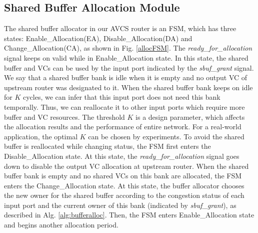 \documentclass[10pt,conference]{IEEEtran}
\begin{document}
\subsection{Shared Buffer Allocation Module}\label{bufmanage}
The shared buffer allocator in our AVCS router is an FSM, which has three states: Enable\_Allocation(EA), Disable\_Allocation(DA) and Change\_Allocation(CA), as shown in Fig. \ref{allocFSM}. The \emph{ready\_for\_allocation} signal keeps on valid while in Enable\_Allocation state. In this state, the shared buffer and VCs can be used by the input port indicated by the \emph{sbuf\_grant} signal. We say that a shared buffer bank is idle when it is empty and no output VC of upstream router was designated to it. When the shared buffer bank keeps on idle for $K$ cycles, we can infer that this input port does not need this bank temporally. Thus, we can reallocate it to other input ports which require more buffer and VC resources. The threshold $K$ is a design parameter, which affects the allocation results and the performance of entire network. For a real-world application, the optimal $K$ can be chosen by experiments. To avoid the shared buffer is reallocated while changing status, the FSM first enters the Disable\_Allocation state. At this state, the \emph{ready\_for\_allocation} signal goes down to disable the output VC allocation at upstream router. When the shared buffer bank is empty and no shared VCs on this bank are allocated, the FSM enters the Change\_Allocation state. At this state, the buffer allocator chooses the new owner for the shared buffer according to the congestion status of each input port and the current owner of this bank (indicated by \emph{sbuf\_grant}), as described in Alg. \ref{alg:bufferalloc}. Then, the FSM enters Enable\_Allocation state and begins another allocation period.

\end{document}
